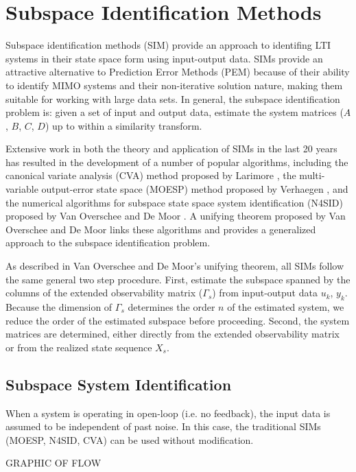 \chapter{Subspace Identification Methods}
Subspace identification methods (SIM) provide an approach to identifing LTI systems in their state space form using input-output data. SIMs provide an attractive alternative to Prediction Error Methods (PEM) because of their ability to identify MIMO systems and their non-iterative solution nature, making them suitable for working with large data sets. In general, the subspace identification problem is: given a set of input and output data, estimate the system matrices ($A$, $B$, $C$, $D$) up to within a similarity transform. 

Extensive work in both the theory and application of SIMs in the last 20 years has resulted in the development of a number of popular algorithms, including the canonical variate analysis (CVA) method proposed by Larimore \cite{larimore1990canonical}, the multi-variable output-error state space (MOESP) method proposed by Verhaegen \cite{verhaegen1992subspace}, and the numerical algorithms for subspace state space system identification (N4SID) proposed by Van Overschee and De Moor \cite{van1994n4sid}. A unifying theorem proposed by Van Overschee and De Moor \cite{van1995unifying} links these algorithms and provides a generalized approach to the subspace identification problem.  

As described in Van Overschee and De Moor's unifying theorem, all SIMs follow the same general two step procedure. First, estimate the subspace spanned by the columns of the extended observability matrix ($\Gamma_s$) from input-output data $u_k$, $y_k$. Because the dimension of $\Gamma_s$ determines the order $n$ of the estimated system, we reduce the order of the estimated subspace before proceeding. Second, the system matrices are determined, either directly from the extended observability matrix or from the realized state sequence $X_s$.


\section{Subspace System Identification}
When a system is operating in open-loop (i.e. no feedback), the input data is assumed to be independent of past noise. In this case, the traditional SIMs (MOESP, N4SID, CVA) can be used without modification. 

GRAPHIC OF FLOW

